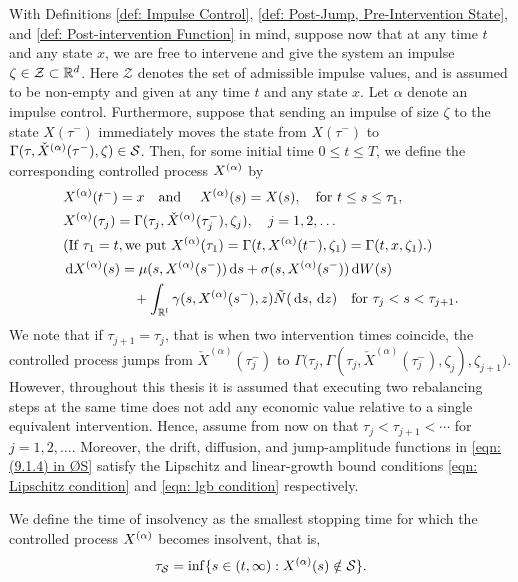 With Definitions \ref{def: Impulse Control}, \ref{def: Post-Jump, Pre-Intervention State}, and \ref{def: Post-intervention Function} in mind, suppose now that at any time $t$ and any state $x$, we are free to intervene and give the system an impulse $\zeta \in \mathcal Z \subset \mathbb{R}^d$. Here $\mathcal Z$ denotes the set of admissible impulse values, and is assumed to be non-empty and given at any time $t$ and any state $x$. Let $\alpha$ denote an impulse control. Furthermore, suppose that sending an impulse of size $\zeta$ to the state $X(\tau^-)$ immediately moves the state from $X(\tau^-)$ to $\Gamma(\tau,\check{X}^{(\alpha)}(\tau^-),\zeta) \in \mathcal{S}$. Then, for some initial time $0 \leq t \leq T$, we define the corresponding controlled process $X^{(\alpha)}$ by
\begin{align}
    & X^{(\alpha)} (t^-) = x \quad \text{and } \quad X^{(\alpha)}(s) = X(s), \quad \text{for } t \leq s \leq \tau_1, \label{eqn: (9.1.2) in ØS} \\
    & X^{(\alpha)} (\tau_j) = \Gamma(\tau_j, \check{X}^{(\alpha)}(\tau_j^-), \zeta_j), \quad j=1,2, \ldots \label{eqn: (9.1.3) in ØS} \\
    & (\text{If } \tau_1=t, \text{we put } X^{(\alpha)}(\tau_1) = \Gamma(t,X^{(\alpha)}(t^-), \zeta_1) = \Gamma(t,x,\zeta_1).) \nonumber \\
    & \,\mathrm{d} X^{(\alpha)}(s) = \mu(s,X^{(\alpha)}(s^-)) \,\mathrm{d} s + \sigma(s,X^{(\alpha)}(s^-)) \,\mathrm{d} W(s) \nonumber \\
    & \qquad \qquad \quad + \int_{\mathbb{R}^l} \gamma(s,X^{(\alpha)}(s^-),z) \tilde N(\,\mathrm{d} s, \,\mathrm{d} z) \quad \text{for } \tau_j < s < \tau_{j+1}. \label{eqn: (9.1.4) in ØS}
\end{align}
We note that if $\tau_{j+1} = \tau_j$, that is when two intervention times coincide, the controlled process jumps from $\check{X}^{(\alpha)}(\tau_j^-)$ to $\Gamma \big(\tau_j,\Gamma(\tau_j,\check{X}^{(\alpha)}(\tau_j^-),\zeta_j),\zeta_{j+1}\big)$. However, throughout this thesis it is assumed that executing two rebalancing steps at the same time does not add any economic value relative to a single equivalent intervention. Hence, assume from now on that $\tau_j < \tau_{j+1} < \cdots$ for $j=1,2, \ldots$. Moreover, the drift, diffusion, and jump-amplitude functions in \eqref{eqn: (9.1.4) in ØS} satisfy the Lipschitz and linear-growth bound conditions \eqref{eqn: Lipschitz condition} and \eqref{eqn: lgb condition} respectively.

\begin{definition}
\label{def: Time of Insolvency}
    We define the time of insolvency as the smallest stopping time for which the controlled process $X^{(\alpha)}$ becomes insolvent, that is,
    \begin{equation*}
        \tau_\mathcal{S} = \inf \{s \in (t,\infty): X^{(\alpha)}(s) \notin \mathcal{S}\}.
    \end{equation*}
\end{definition}

